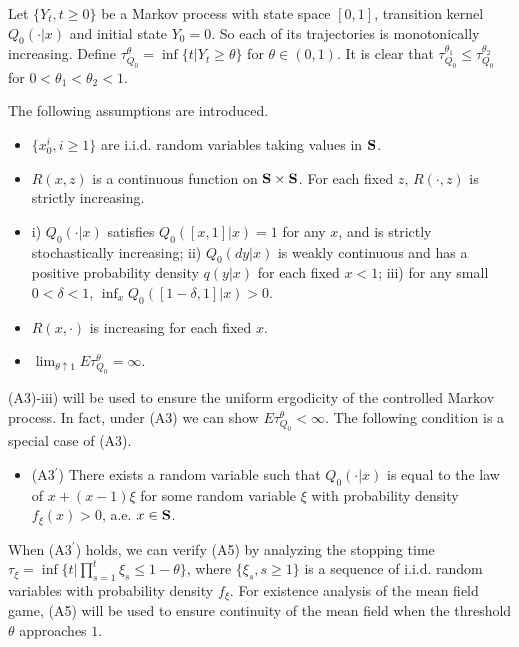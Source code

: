 \documentclass[graybox]{svmult}
\def\bS{{\bf S}}
\begin{document}
Let $\{Y_t, t\ge 0\}$ be a Markov process with state space $[0,1]$,
transition kernel $Q_0(\cdot|x)$ and initial state $Y_0=0$. So each of its trajectories is monotonically increasing. Define $\tau_{Q_0}^\theta=\inf\{t|Y_t \ge \theta\}$ for $\theta\in (0, 1)$. It is clear that  $\tau_{Q_0}^{\theta_1} \le  \tau_{Q_0}^{\theta_2}$ for $0<\theta_1<\theta_2<1$.


The following assumptions are introduced.


\begin{itemize}

\item[(A1)] \qquad $\{x_0^i, i\ge 1\}$ are i.i.d. random variables taking values in $\bS$.


\item[(A2)]\qquad $R(x,z)$ is a continuous function  on  $\bS\times \bS$.
  For each fixed $z$, $R(\cdot, z)$ is  strictly increasing.

\item[(A3)] \qquad i) $Q_0(\cdot |x)$ satisfies $Q_0([x,1]|x)=1$ for any $x$, and is
strictly  stochastically increasing; ii)
 $Q_0(dy|x)$ is weakly continuous and has a positive probability density $q(y|x)$ for each fixed $x<1$; iii) for any small $0<\delta<1$,  $\inf_xQ_0([1-\delta, 1 ]|x)>0$.



\item[(A4)]\qquad $R(x, \cdot)$ is increasing for each fixed $x$.

\item[(A5)]\qquad  $\lim_{\theta\uparrow 1}E\tau_{Q_0}^\theta =\infty$.
\end{itemize}




(A3)-iii) will be used to ensure the uniform ergodicity of the controlled Markov process.
In fact, under (A3) we can show $E\tau_{Q_0}^\theta <\infty$.
The following condition is a special case of (A3).

\begin{itemize}
\item[] (A3$^\prime$) There exists a random variable such that
$Q_0(\cdot|x)$ is equal to the law of $x+(x-1)\xi$ for some random variable $\xi$ with probability  density $f_\xi(x)>0$, a.e. $x\in \bS$.



\end{itemize}


When (A3$^\prime$) holds, we can verify (A5) by analyzing the stopping time $\tau_\xi=\inf\{t|\prod_{s=1}^t \xi_s\le 1-\theta\}$, where $\{\xi_s, s\ge 1\}$ is a sequence of i.i.d. random variables with probability density $f_\xi$.  For existence analysis of the mean field game, (A5) will be used to ensure continuity of the mean field when the threshold $\theta$ approaches $1$.
\end{document}

